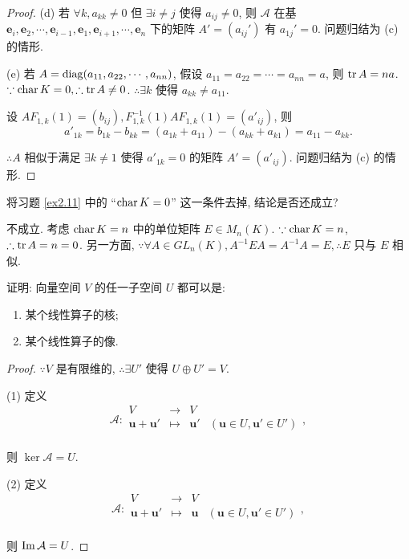 \documentclass[color=black,device=normal,lang=cn,mode=geye]{elegantnote}
\begin{document}
\begin{proof}
    (d) 若 $\forall k,a_{kk}\neq0$ 但 $\exists i\neq j$ 使得 $a_{ij}\neq0$, 则 $\mathcal{A}$ 在基 $\boldsymbol{e}_i,\boldsymbol{e}_2,\cdots,\boldsymbol{e}_{i-1},\boldsymbol{e}_1,\boldsymbol{e}_{i+1},\cdots,\boldsymbol{e}_n$ 下的矩阵 $A'=(a_{ij}')$ 有 $a_{1j}'=0$. 问题归结为 (c) 的情形.

    (e) 若 $A=\operatorname{diag} (a_{11},a_{22},\cdots,a_{nn})$, 假设 $a_{11}=a_{22}=\cdots=a_{nn}=a$, 则 $\operatorname{tr} A=na$. $\because\operatorname{char} K=0,\therefore\operatorname{tr} A\neq0$. $\therefore\exists k$ 使得 $a_{kk}\neq a_{11}$.

    设 $AF_{1,k}(1)=(b_{ij}),F^{-1}_{1,k}(1)AF_{1,k}(1)=(a'_{ij})$, 则
    \[a'_{1k}=b_{1k}-b_{kk}=(a_{1k}+a_{11})-(a_{kk}+a_{k1})=a_{11}-a_{kk}.\]

    $\therefore A$ 相似于满足 $\exists k\neq 1$ 使得 $a'_{1k}=0$ 的矩阵 $A'=(a'_{ij})$. 问题归结为 (c) 的情形.
\end{proof}
\begin{exercise}%
    将习题 \ref{ex2.11} 中的 ``$\operatorname{char} K=0$'' 这一条件去掉, 结论是否还成立?
\end{exercise}
\begin{solution}
    不成立. 考虑 $\operatorname{char} K=n$ 中的单位矩阵 $E\in M_n(K)$. $\because\operatorname{char} K=n$, $\therefore\operatorname{tr} A=n=0$. 另一方面, $\because\forall A\in GL _n(K),A^{-1}EA=A^{-1}A=E,\therefore E$ 只与 $E$ 相似.
\end{solution}
\begin{exercisec}[2.2.4]
    证明: 向量空间 $V$ 的任一子空间 $U$ 都可以是:
    \begin{enumerate}
        \def\labelenumi{(\arabic{enumi})}
        \item 某个线性算子的核;
        \item 某个线性算子的像.
    \end{enumerate}
\end{exercisec}
\begin{proof}
    $\because V$ 是有限维的, $\therefore\exists U'$ 使得 $U\oplus U'=V$.

    (1) 定义
    \[\mathcal{A}:\begin{array}{rcll}
        V & \to & V \\
        \boldsymbol{u}+\boldsymbol{u}' & \mapsto & \boldsymbol{u}' & (\boldsymbol{u}\in U,\boldsymbol{u}'\in U') \\
    \end{array},\]

    则 $\ker\mathcal{A}=U$.

    (2) 定义
    \[\mathcal{A}:\begin{array}{rcll}
        V & \to & V \\
        \boldsymbol{u}+\boldsymbol{u}' & \mapsto & \boldsymbol{u} & (\boldsymbol{u}\in U,\boldsymbol{u}'\in U') \\
    \end{array},\]

    则 $\operatorname{Im}\mathcal{A}=U$.
\end{proof}
\end{document}
